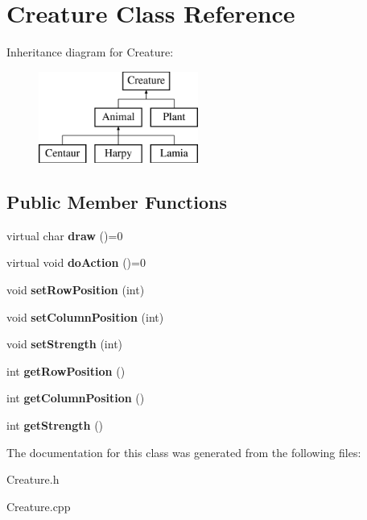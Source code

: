 \hypertarget{class_creature}{}\section{Creature Class Reference}
\label{class_creature}
Inheritance diagram for Creature\+:\begin{figure}[H]
\begin{center}
\leavevmode
\includegraphics[height=3.000000cm]{class_creature}
\end{center}
\end{figure}
\subsection*{Public Member Functions}
\begin{DoxyCompactItemize}
\item 
virtual char {\bfseries draw} ()=0\hypertarget{class_creature_a5be2a9f038cd7641974462a80a009198}{}\label{class_creature_a5be2a9f038cd7641974462a80a009198}

\item 
virtual void {\bfseries do\+Action} ()=0\hypertarget{class_creature_ae40c732ab8eccea97404b9282fdd1138}{}\label{class_creature_ae40c732ab8eccea97404b9282fdd1138}

\item 
void {\bfseries set\+Row\+Position} (int)\hypertarget{class_creature_a1bc33218a560eff8162a2e795e90251f}{}\label{class_creature_a1bc33218a560eff8162a2e795e90251f}

\item 
void {\bfseries set\+Column\+Position} (int)\hypertarget{class_creature_a4ab0c6b21b0826ed9691583eec078bec}{}\label{class_creature_a4ab0c6b21b0826ed9691583eec078bec}

\item 
void {\bfseries set\+Strength} (int)\hypertarget{class_creature_a032ac31736090da076da0ec1466c27bf}{}\label{class_creature_a032ac31736090da076da0ec1466c27bf}

\item 
int {\bfseries get\+Row\+Position} ()\hypertarget{class_creature_a8062f777315929e10e5d626e95366438}{}\label{class_creature_a8062f777315929e10e5d626e95366438}

\item 
int {\bfseries get\+Column\+Position} ()\hypertarget{class_creature_addfbfaf75df9268fa1288c29c50abcd0}{}\label{class_creature_addfbfaf75df9268fa1288c29c50abcd0}

\item 
int {\bfseries get\+Strength} ()\hypertarget{class_creature_aae311cca00cca409e3e790a96ad14b97}{}\label{class_creature_aae311cca00cca409e3e790a96ad14b97}

\end{DoxyCompactItemize}


The documentation for this class was generated from the following files\+:\begin{DoxyCompactItemize}
\item 
Creature.\+h\item 
Creature.\+cpp\end{DoxyCompactItemize}
